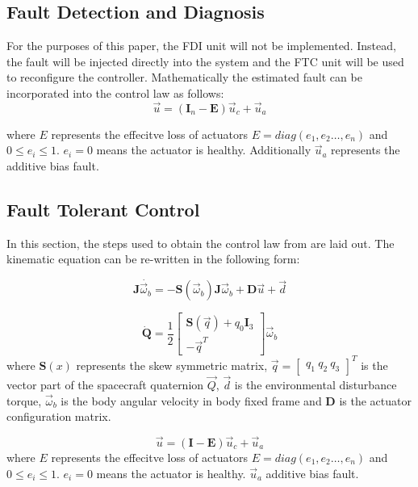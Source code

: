 \subsection{Fault Detection and Diagnosis}
For the purposes of this paper, the FDI unit will not be implemented. Instead, the fault will be injected directly into the system and the FTC unit will be used to reconfigure the controller. Mathematically the estimated fault can be incorporated into the control law as follows:
\begin{equation}\vec{u}=(\mathbf{I}_{n}-\mathbf{E})\vec{u}_{c}+\vec{u}_{a}\end{equation}

where $E$ represents the effecitve loss of actuators $E=diag(e_{1},e_{2}\dots,e_{n})$ and $0\leq e_{i}\leq 1$. $e_{i}=0$ means the actuator is healthy. Additionally $\vec{u}_{a}$ represents the additive bias fault.

\subsection{Fault Tolerant Control}
In this section, the steps used to obtain the control law from \cite{shenActiveFaulttolerantControl2019} are laid out. The kinematic equation can be re-written in the following form:


\begin{equation}\mathbf{J}\dot{\vec{\omega}_{b}}=-\mathbf{S}(\vec{\omega}_{b})\mathbf{J}\vec{\omega}_{b}+\mathbf{D}\vec{u}+\vec{d}\end{equation}

\begin{equation} \dot{\mathbf{Q}}=\frac{1}{2}\begin{bmatrix}
\mathbf{S}(\vec{q})+q_{0}\mathbf{I}_{3} \\
-\vec{q}^{T}
\end{bmatrix} \vec{\omega}_{b}\end{equation}
where $\mathbf{S}(x)$ represents the skew symmetric matrix, 
$\vec{q}=\begin{bmatrix}q_{1} \ q_{2} \ q_{3} \end{bmatrix}^T$ is the vector part of the spacecraft quaternion $\vec{Q}$,
$\vec{d}$ is the environmental disturbance torque,
$\vec{\omega}_{b}$ is the body angular velocity in body fixed frame and
$\mathbf{D}$ is the actuator configuration matrix.

\begin{equation}\vec{u}=(\mathbf{I}-\mathbf{E})\vec{u}_{c}+\vec{u}_{a}\end{equation}
where $E$ represents the effecitve loss of actuators $E=diag(e_{1},e_{2}\dots,e_{n})$ and $0\leq e_{i}\leq 1$. $e_{i}=0$ means the actuator is healthy. $\vec{u}_{a}$ additive bias fault.


